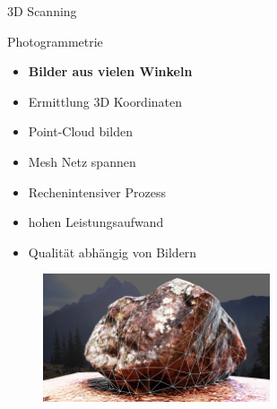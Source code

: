 \begin{frame}{3D Scanning}
    
    \begin{minipage}[m]{.49\textwidth}
    \begin{block}{Photogrammetrie}
        \begin{itemize}
            \item \textbf{Bilder aus vielen Winkeln}
            \item Ermittlung 3D Koordinaten
            \item Point-Cloud bilden
            \item Mesh Netz spannen
            \item Rechenintensiver Prozess
            \item hohen Leistungsaufwand
            \item Qualität abhängig von Bildern
        \end{itemize}    
    \end{block}
    \end{minipage}
    \begin{minipage}[m]{.49\textwidth}
        \begin{figure}[]
          \includegraphics[width=190pt]{img_niklas/photogrammetrie_6014830.jpg}
          \label{fig:my_label}
      \end{figure}    
    \end{minipage}
    
\end{frame}

